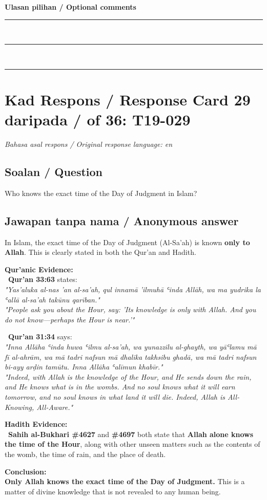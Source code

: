 \documentclass[11pt,a4paper]{article}
\begin{document}
\medskip
\textbf{Ulasan pilihan / Optional comments}\\[3pt]
\rule{\textwidth}{0.4pt}\\[16pt]
\rule{\textwidth}{0.4pt}\\[16pt]
\rule{\textwidth}{0.4pt}

\newpage
\section*{Kad Respons / Response Card 29 daripada / of 36: T19-029}
\textit{Bahasa asal respons / Original response language: en}

\subsection*{Soalan / Question}
Who knows the exact time of the Day of Judgment in Islam?

\subsection*{Jawapan tanpa nama / Anonymous answer}
In Islam, the exact time of the Day of Judgment (Al-Sa'ah) is known \textbf{only to Allah}. This is clearly stated in both the Qur'an and Hadith.\par\medskip \textbf{Qur'anic Evidence:}\\ \textbullet\ \textbf{Qur'an 33:63} states:\\ \emph{"Yas'aluka al-nas 'an al-sa'ah, qul innamā 'ilmuhā ʿinda Allāh, wa ma yudrika la ʿallā al-sa'ah takūnu qarīban."}\\ \emph{"People ask you about the Hour, say: 'Its knowledge is only with Allah. And you do not know—perhaps the Hour is near.'"}\par\medskip \textbullet\ \textbf{Qur'an 31:34} says:\\ \emph{"Inna Allāha ʿinda huwa ʿilmu al-sa'ah, wa yunazzilu al-ghayth, wa yāʿlamu mā fī al-ahrām, wa mā tadri nafsun mā dhalika takhsibu ghadā, wa mā tadri nafsun bi-ayy arḍin tamūtu. Inna Allāha ʿalīmun khabīr."}\\ \emph{"Indeed, with Allah is the knowledge of the Hour, and He sends down the rain, and He knows what is in the wombs. And no soul knows what it will earn tomorrow, and no soul knows in what land it will die. Indeed, Allah is All-Knowing, All-Aware."}\par\medskip \textbf{Hadith Evidence:}\\ \textbullet\ \textbf{Sahih al-Bukhari \#4627} and \textbf{\#4697} both state that \textbf{Allah alone knows the time of the Hour}, along with other unseen matters such as the contents of the womb, the time of rain, and the place of death.\par\medskip \textbf{Conclusion:}\\ \textbf{Only Allah knows the exact time of the Day of Judgment.} This is a matter of divine knowledge that is not revealed to any human being.
\end{document}
